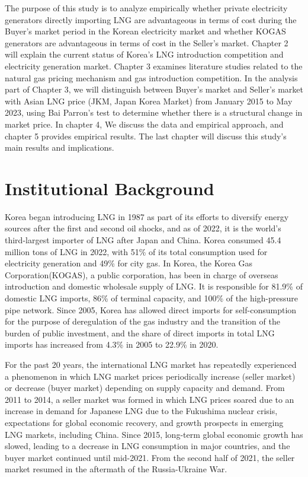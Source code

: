 \documentclass[12pt]{article}
\begin{document}
The purpose of this study is to analyze empirically whether private electricity generators directly importing LNG are advantageous in terms of cost during the Buyer's market period in the Korean electricity market and whether KOGAS generators are advantageous in terms of cost in the Seller's market. Chapter 2 will explain the current status of Korea's LNG introduction competition and electricity generation market.  Chapter 3 examines literature studies related to the natural gas pricing mechanism and gas introduction competition. In the analysis part of Chapter 3, we will distinguish between Buyer's market and Seller's market with Asian LNG price (JKM, Japan Korea Market) from January 2015 to May 2023, using Bai Parron's test to determine whether there is a structural change in market price. In chapter 4, We discuss the data and empirical approach, and chapter 5 provides empirical results. The last chapter will discuss this study's main results and implications.





\newpage
\section{Institutional Background}

Korea began introducing LNG in 1987 as part of its efforts to diversify energy sources after the first and second oil shocks, and as of 2022, it is the world's third-largest importer of LNG after Japan and China. Korea consumed 45.4 million tons of LNG in 2022, with 51\% of its total consumption used for electricity generation and 49\% for city gas. In Korea, the Korea Gas Corporation(KOGAS), a public corporation, has been in charge of overseas introduction and domestic wholesale supply of LNG. It is responsible for 81.9\% of domestic LNG imports, 86\% of terminal capacity, and 100\% of the high-pressure pipe network. Since 2005, Korea has allowed direct imports for self-consumption for the purpose of deregulation of the gas industry and the transition of the burden of public investment, and the share of direct imports in total LNG imports has increased from 4.3\% in 2005 to 22.9\% in 2020.

For the past 20 years, the international LNG market has repeatedly experienced a phenomenon in which LNG market prices periodically increase (seller market) or decrease (buyer market) depending on supply capacity and demand. From 2011 to 2014, a seller market was formed in which LNG prices soared due to an increase in demand for Japanese LNG due to the Fukushima nuclear crisis, expectations for global economic recovery, and growth prospects in emerging LNG markets, including China. Since 2015, long-term global economic growth has slowed, leading to a decrease in LNG consumption in major countries, and the buyer market continued until mid-2021. From the second half of 2021, the seller market resumed in the aftermath of the Russia-Ukraine War.
\end{document}
